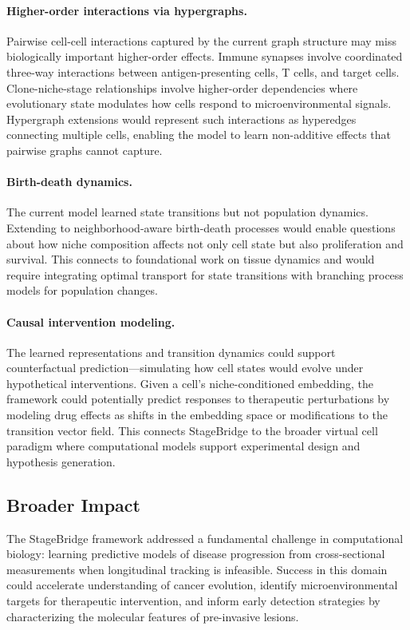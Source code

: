 \paragraph{Higher-order interactions via hypergraphs.} Pairwise cell-cell interactions captured by the current graph structure may miss biologically important higher-order effects. Immune synapses involve coordinated three-way interactions between antigen-presenting cells, T cells, and target cells. Clone-niche-stage relationships involve higher-order dependencies where evolutionary state modulates how cells respond to microenvironmental signals. Hypergraph extensions would represent such interactions as hyperedges connecting multiple cells, enabling the model to learn non-additive effects that pairwise graphs cannot capture.

\paragraph{Birth-death dynamics.} The current model learned state transitions but not population dynamics. Extending to neighborhood-aware birth-death processes would enable questions about how niche composition affects not only cell state but also proliferation and survival. This connects to foundational work on tissue dynamics and would require integrating optimal transport for state transitions with branching process models for population changes.

\paragraph{Causal intervention modeling.} The learned representations and transition dynamics could support counterfactual prediction---simulating how cell states would evolve under hypothetical interventions. Given a cell's niche-conditioned embedding, the framework could potentially predict responses to therapeutic perturbations by modeling drug effects as shifts in the embedding space or modifications to the transition vector field. This connects StageBridge to the broader virtual cell paradigm where computational models support experimental design and hypothesis generation.


\subsection{Broader Impact}

The StageBridge framework addressed a fundamental challenge in computational biology: learning predictive models of disease progression from cross-sectional measurements when longitudinal tracking is infeasible. Success in this domain could accelerate understanding of cancer evolution, identify microenvironmental targets for therapeutic intervention, and inform early detection strategies by characterizing the molecular features of pre-invasive lesions.

